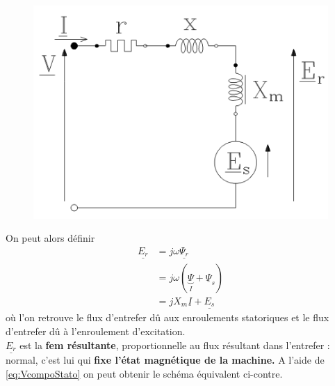 		
		\begin{figure}
		\includegraphics[scale=0.4]{ch7/image4.png}
		\label{eq:Waw}
		\end{figure}			
		On peut alors définir
		\begin{equation}
		\begin{array}{ll}
		\underline{E_r} &= j\omega\underline{\Psi_r}\\
		&= j \omega (\underbrace{\Psi}_I+\underline{\Psi}_s)\\
		&= jX_m\underline{I}+\underline{E_s}
		\end{array}
		\end{equation}
		où l'on retrouve le flux d'entrefer dû aux enroulements statoriques et le flux 
		d'entrefer dû à l'enroulement d'excitation.\\
		$\underline{E_r}$ est la \textbf{fem résultante}, proportionnelle au flux résultant 
		dans l'entrefer : normal, c'est lui qui \textbf{fixe l'état magnétique de la machine.}
		A l'aide de \autoref{eq:VcompoStato} on peut obtenir le schéma équivalent ci-contre.
		
		\newpage
